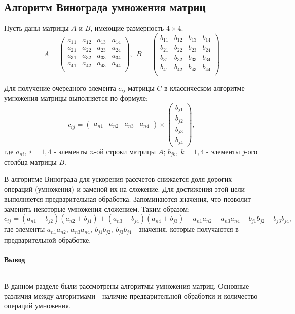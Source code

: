 \subsection{Алгоритм Винограда умножения матриц}

Пусть даны матрицы $A$ и  $B$, имеющие размерность  $4\times 4$.
\begin{equation}
    A = 
\begin{pmatrix}
    a_{11} & a_{12} & a_{13} & a_{14} \\
    a_{21} & a_{22} & a_{23} & a_{24} \\
    a_{31} & a_{32} & a_{33} & a_{34} \\
    a_{41} & a_{42} & a_{43} & a_{44} \\
\end{pmatrix}, \ \
    B = 
\begin{pmatrix}
    b_{11} & b_{12} & b_{13} & b_{14} \\
    b_{21} & b_{22} & b_{23} & b_{24} \\
    b_{31} & b_{32} & b_{33} & b_{34} \\
    b_{41} & b_{42} & b_{43} & b_{44} \\
\end{pmatrix}
\end{equation}

Для получение очередного элемента $c_{ij}$ матрицы $C$ в классическом
алгоритме умножения матрицы выполняется по формуле:
\begin{equation}
    c_{ij} = \begin{pmatrix} a_{n1} & a_{n2} & a_{n3} & a_{n4} \end{pmatrix} 
    \times 
    \begin{pmatrix} b_{j1}\\ b_{j2}\\ b_{j3}\\ b_{j4} \end{pmatrix},
\end{equation}
где $a_{ni}, \ i = \overline{1,4}$ - элементы $n$-ой строки матрицы  $A$;
$b_{jk}, \ k = \overline{1,4}$ - элементы $j$-ого столбца матрицы  $B$.

В алгоритме Винограда для ускорения рассчетов снижается доля дорогих операций (умножения) и
заменой их на сложение. Для достижения этой цели выполняется предварительная обработка.
Запоминаются значения, что позволит заменить некоторые умножения сложением. Таким
образом:
\begin{equation}
    c_{ij} = (a_{n1} + b_{j2}) (a_{n2} + b_{j1})
    + (a_{n3} + b_{j4})(a_{n4} + b_{j 3})
    - a_{n 1}a_{n 2} - a_{n 3}a_{n 4} - b_{j 1}b_{j 2} - b_{j 3}b_{j 4},
\end{equation}
где элементы $a_{n 1}a_{n 2}, \ a_{n 3}a_{n 4}, \ b_{j 1}b_{j 2}, \ b_{j 3}b_{j 4}$ - значения,
которые получаются в предварительной обработке.

\paragraph*{Вывод} ${}$ \newline

В данном разделе были рассмотрены алгоритмы умножения матриц. Основные различия между
алгоритмами - наличие предварительной обработки и количество операций умножения.


